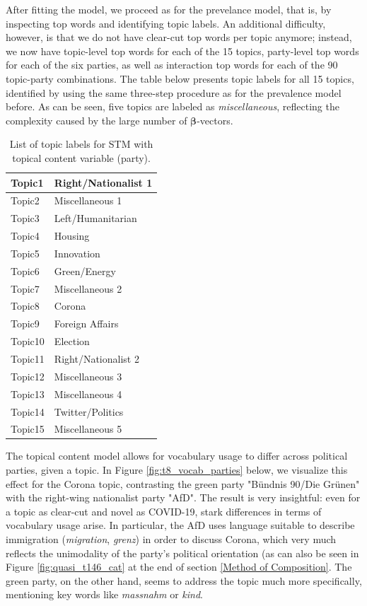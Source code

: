 After fitting the model, we proceed as for the prevelance model, that is, by inspecting top words and identifying topic labels. An additional difficulty, however, is that we do not have clear-cut top words per topic anymore; instead, we now have topic-level top words for each of the 15 topics, party-level top words for each of the six parties, as well as interaction top words for each of the 90 topic-party combinations. The table below presents topic labels for all 15 topics, identified by using the same three-step procedure as for the prevalence model before. As can be seen, five topics are labeled as \textit{miscellaneous}, reflecting the complexity caused by the large number of $\boldsymbol{\beta}$-vectors.

\begin{table}[h!]
	\centering
	\captionsetup{justification=centering,margin=2cm}
	\begin{tabular}{|l|l|}
	\hline
	Topic1  & Right/Nationalist 1  \\ \hline
	Topic2  & Miscellaneous 1      \\ \hline
	Topic3  & Left/Humanitarian    \\ \hline
	Topic4  & Housing       	   \\ \hline
	Topic5  & Innovation           \\ \hline
	Topic6  & Green/Energy         \\ \hline
	Topic7  & Miscellaneous 2      \\ \hline
	Topic8  & Corona               \\ \hline
	Topic9  & Foreign Affairs      \\ \hline
	Topic10 & Election             \\ \hline
	Topic11 & Right/Nationalist 2  \\ \hline
	Topic12 & Miscellaneous 3      \\ \hline
	Topic13 & Miscellaneous 4      \\ \hline
	Topic14 & Twitter/Politics     \\ \hline
	Topic15 & Miscellaneous 5      \\ \hline
	\end{tabular}
	\caption{List of topic labels for STM with topical content variable (party).}
	\label{Tab:labels_content}
\end{table}

The topical content model allows for vocabulary usage to differ across political parties, given a topic. In Figure \ref{fig:t8_vocab_parties} below, we visualize this effect for the Corona topic, contrasting the green party "Bündnis 90/Die Grünen" with the right-wing nationalist party "AfD". The result is very insightful: even for a topic as clear-cut and novel as COVID-19, stark differences in terms of vocabulary usage arise. In particular, the AfD uses language suitable to describe immigration (\textit{migration}, \textit{grenz}) in order to discuss Corona, which very much reflects the unimodality of the party's political orientation (as can also be seen in Figure \ref{fig:quasi_t146_cat} at the end of section \ref{Method of Composition}. The green party, on the other hand, seems to address the topic much more specifically, mentioning key words like \textit{massnahm} or \textit{kind}.

